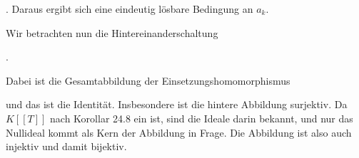 {{{ } {
}

}
{}
{}{.}
Daraus ergibt sich eine eindeutig lösbare Bedingung an $a_k$.


Wir betrachten nun die Hintereinanderschaltung


 { . }


Dabei ist die Gesamtabbildung der Einsetzungshomomorphismus

 und das ist die Identität. Insbesondere ist die hintere Abbildung surjektiv. Da $K [ \![ T ]\! ]$ nach
Korollar 24.8
ein
ist, sind die Ideale darin bekannt, und nur das Nullideal kommt als Kern der Abbildung in Frage. Die Abbildung ist also auch injektiv und damit bijektiv.


}
